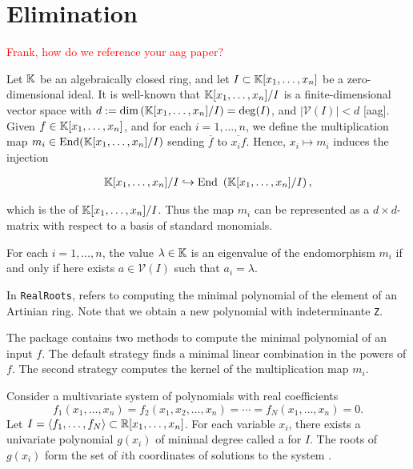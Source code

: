 


\section{Elimination}


\textcolor{red}{Frank, how do we reference your aag paper?}

Let $\mathbb{K}$ be an algebraically closed ring, and let $I\subset \mathbb{K}[x_{1},\dots,x_{n}]$ be a zero-dimensional ideal. It is well-known that $\mathbb{K}[x_{1},\dots,x_{n}]/I$ is a finite-dimensional vector space with $d:=\text{dim}\left( \mathbb{K}[x_{1},
\dots, x_{n}]/I \right) = \deg(I)$, and $|\mathcal{V}(I)|< d$ [aag]. Given $f\in \mathbb{K}[x_{1},\dots, x_{n}]$, and for each $i=1,\dots,n$, we define the multiplication map $m_{i}\in \text{End} (\mathbb{K}[x_{1},\dots, x_{n}]/I)$ sending $\overline{f}$ to $\overline{x_{i}f}$. Hence, $x_{i}\mapsto m_{i}$ induces the injection

\begin{align*}\mathbb{K}[x_{1},\dots,x_{n}]/I \hookrightarrow \text{End }\left(\mathbb{K}[x_{1},\dots, x_{n}]/I \right), \end{align*}

which is the  of $\mathbb{K}[x_{1},\dots,x_{n}]/I$. Thus the map $m_{i}$ can be represented as a $d\times d$-matrix with respect to a basis of standard monomials.

\begin{theorem} For each $i=1,\dots, n$, the value $\lambda \in \mathbb{K}$ is an eigenvalue of the endomorphism $m_{i}$ if and only if here exists $a\in \mathcal{V}(I)$ such that $a_{i}=\lambda$.
\end{theorem}

In \texttt{RealRoots},  refers to computing the minimal polynomial of the element of an Artinian ring. Note that we obtain a new polynomial with indeterminante \texttt{Z}.
%
\begin{leftbar}

\end{leftbar}
%
The package contains two methods to compute the minimal polynomial of an input $f$. The default strategy finds a minimal linear combination in the powers of $f$. The second strategy computes the kernel of the multiplication map $m_{i}$.
%
\begin{leftbar}

\end{leftbar}
Consider a multivariate system of polynomials with real coefficients \[f_{1}(x_{1},\dots,x_{n}) = f_{2}(x_{1},x_{2},\dots, x_{n}) = \cdots = f_{N}(x_{1},\dots, x_{n}) = 0.
\] Let $I = \langle f_{1},\dots,f_{N}\rangle \subset \mathbb{R}[x_{1},\dots,x_{n}]$. For each variable $x_{i}$, there exists a univariate polynomial $g(x_{i})$ of minimal degree called a  for $I$. The roots of $g(x_{i})$ form the set of $i$th coordinates of solutions to the system \cite{So_Book}.


